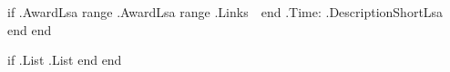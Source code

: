     {{ if .AwardLsa }}
            {{range .AwardLsa}}%
                {{range .Links}}%
                \href{{print "{" . "}" }}{\extlinkIcon}\,\,%
                {{end}}%
                {{.Time}}: %
                {{.DescriptionShortLsa}}
                \\[5pt]%
            {{end}}%
    {{ end }}

    {{ if .List }}
        {{.List}}
    {{ end }}
{{ end }}